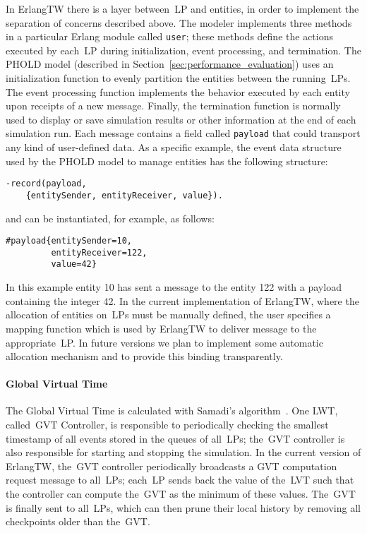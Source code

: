 \documentclass{sigplanconf}
\begin{document}
In ErlangTW there is a layer between~\ac{LP} and entities, in order to
implement the separation of concerns described above. The modeler
implements three methods in a particular Erlang module called
\texttt{user}; these methods define the actions executed by
each~\ac{LP} during initialization, event processing, and
termination. The PHOLD model (described in
Section~\ref{sec:performance_evaluation}) uses an initialization
function to evenly partition the entities between the
running~\acp{LP}. The event processing function implements the
behavior executed by each entity upon receipts of a new
message. Finally, the termination function is normally used to display
or save simulation results or other information at the end of each
simulation run. Each message contains a field called \verb+payload+
that could transport any kind of user-defined data. As a specific
example, the event data structure used by the PHOLD model to manage
entities has the following structure:

\begin{verbatim}
-record(payload, 
    {entitySender, entityReceiver, value}).
\end{verbatim}

\noindent and can be instantiated, for example, as follows:

\begin{verbatim}
#payload{entitySender=10, 
         entityReceiver=122, 
         value=42}
\end{verbatim}

In this example entity 10 has sent a message to the entity 122 with a
payload containing the integer 42. In the current implementation of
ErlangTW, where the allocation of entities on~\acp{LP} must be
manually defined, the user specifies a mapping function which is used
by ErlangTW to deliver message to the appropriate~\ac{LP}. In future
versions we plan to implement some automatic allocation mechanism and
to provide this binding transparently.

\paragraph*{Global Virtual Time}
The Global Virtual Time is calculated with Samadi's
algorithm~\cite{SMP87}. One LWT, called~\ac{GVT} Controller, is
responsible to periodically checking the smallest timestamp of all
events stored in the queues of all~\acp{LP}; the~\ac{GVT} controller
is also responsible for starting and stopping the simulation. In the
current version of ErlangTW, the~\ac{GVT} controller periodically
broadcasts a GVT computation request message to all~\acp{LP};
each~\ac{LP} sends back the value of the~\ac{LVT} such that the
controller can compute the~\ac{GVT} as the minimum of these values.
The~\ac{GVT} is finally sent to all~\acp{LP}, which can then prune
their local history by removing all checkpoints older than
the~\ac{GVT}.
\end{document}
